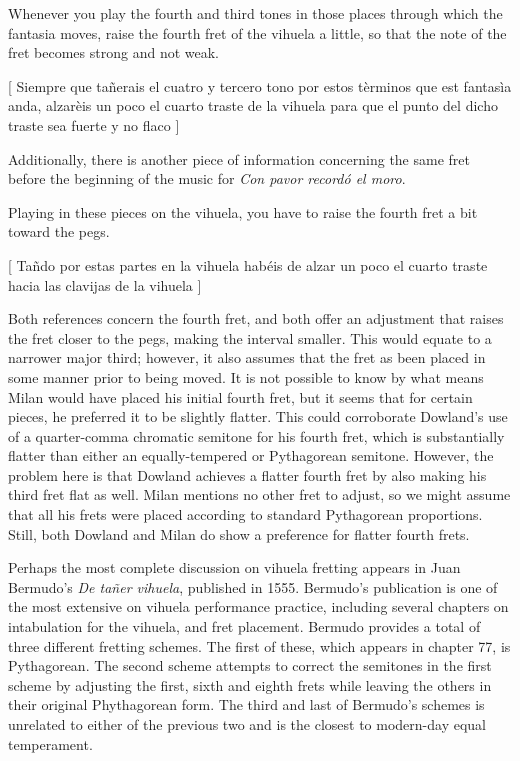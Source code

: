 \begin{blocks}
Whenever you play the fourth and third tones in those places through which the fantasia moves,
raise the fourth fret of the vihuela a little, so that the note of the fret becomes strong
and not weak.

[ Siempre que ta\~{n}erais el cuatro y tercero tono por estos t\`{e}rminos que est fantas\`{i}a
anda, alzar\`{e}is un poco el cuarto traste de la vihuela para que el punto del dicho traste
sea fuerte y no flaco ]\autocite[156]{LG:1}
\end{blocks}

Additionally, there is another piece of information concerning the same fret before the
beginning of the music for \textit{Con pavor record\'{o} el moro}.

\begin{blocks}
Playing in these pieces on the vihuela, you have to raise the fourth fret a bit toward the pegs.

[ Ta\~{n}do por estas partes en la vihuela hab\'{e}is de alzar un poco el cuarto traste hacia las
clavijas de la vihuela ]\autocite[156]{LG:1}
\end{blocks}

Both references concern the fourth fret, and both offer an adjustment that raises the fret closer
to the pegs, making the interval smaller.  This would equate to a narrower major third; however,
it also assumes that the fret as been placed in some manner prior to being moved.  It is not
possible to know by what means Milan would have placed his initial fourth fret, but it seems
that for certain pieces, he preferred it to be slightly flatter.  This could corroborate
Dowland's use of a quarter-comma chromatic semitone for his fourth fret, which is substantially
flatter than either an equally-tempered or Pythagorean semitone.  However, the problem here
is that Dowland achieves a flatter fourth fret by also making his third fret flat as well.  Milan
mentions no other fret to adjust, so we might assume that all his frets were placed according
to standard Pythagorean proportions.  Still, both Dowland and Milan
do show a preference for flatter fourth frets.

Perhaps the most complete discussion on vihuela fretting appears in Juan Bermudo's \textit{De ta\~{n}er vihuela},
published in 1555.  Bermudo's publication is one of the most extensive on vihuela performance practice,
including several chapters on intabulation for the vihuela, and fret placement.  Bermudo provides a
total of three different fretting schemes.  The first of these, which appears in chapter
77, is Pythagorean.  The second scheme attempts to correct the semitones in the first
scheme by adjusting the first, sixth and eighth frets while leaving the others in their
original Phythagorean form.  The third and last of Bermudo's schemes is unrelated to either
of the previous two and is the closest to modern-day equal temperament.

